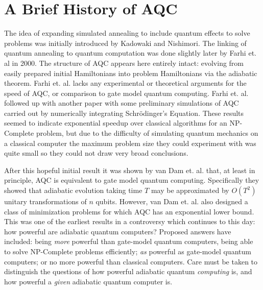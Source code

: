 \chapter{A Brief History of AQC}
The idea of expanding simulated annealing to include quantum effects to solve problems was initially introduced by Kadowaki and Nishimori.\cite{transverse}  The linking of quantum annealing to quantum computation was done slightly later by Farhi et. al in 2000.\cite{farhi}  The structure of AQC appears here entirely intact: evolving from easily prepared initial Hamiltonians into problem Hamiltonians via the adiabatic theorem.  Farhi et. al.\cite{farhi} lacks any experimental or theoretical arguments for the speed of AQC, or comparison to gate model quantum computing.  Farhi et. al. followed up with another paper\cite{farhi2} with some preliminary simulations of AQC carried out by numerically integrating Schr\"odinger's Equation.  These results seemed to indicate exponential speedup over classical algorithms for an NP-Complete problem, but due to the difficulty of simulating quantum mechanics on a classical computer the maximum problem size they could experiment with was quite small so they could not draw very broad conclusions.

After this hopeful initial result it was shown by van Dam et. al.\cite{vandam} that, at least in principle, AQC is equivalent to gate model quantum computing.  Specifically they showed that adiabatic evolution taking time $T$ may be approximated by $O(T^2)$ unitary transformations of $n$ qubits.  However, van Dam et. al. also designed a class of minimization problems for which AQC has an exponential lower bound.  This was one of the earliest results in a controversy which continues to this day: how powerful are adiabatic quantum computers?  Proposed answers have included: being \emph{more} powerful than gate-model quantum computers, being able to solve NP-Complete problems efficiently; \emph{as} powerful as gate-model quantum computers; or no more powerful than classical computers.  Care must be taken to distinguish the questions of how powerful adiabatic quantum \emph{computing} is, and how powerful a \emph{given} adiabatic quantum computer is.

